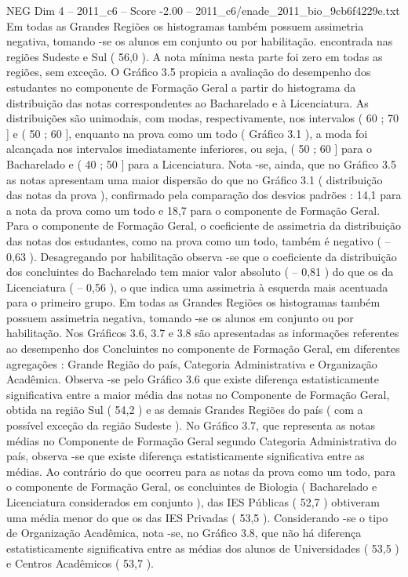 \begin{textsample}{NEG Dim 4 – 2011\_c6 – Score -2.00 – 2011\_c6/enade\_2011\_bio\_9cb6f4229e.txt}
Em todas as Grandes Regiões os histogramas também possuem assimetria negativa, tomando -se os alunos em conjunto ou por habilitação. encontrada nas regiões Sudeste e Sul ( 56,0 ).
A nota mínima nesta parte foi zero em todas as regiões, sem exceção.
O Gráfico 3.5 propicia a avaliação do desempenho dos estudantes no componente de Formação Geral a partir do histograma da distribuição das notas correspondentes ao Bacharelado e à Licenciatura.
As distribuições são unimodais, com modas, respectivamente, nos intervalos ( 60 ; 70 ] e ( 50 ; 60 ], enquanto na prova como um todo ( Gráfico 3.1 ), a moda foi alcançada nos intervalos imediatamente inferiores, ou seja, ( 50 ; 60 ] para o Bacharelado e ( 40 ; 50 ] para a Licenciatura.
Nota -se, ainda, que no Gráfico 3.5 as notas apresentam uma maior dispersão do que no Gráfico 3.1 ( distribuição das notas da prova ), confirmado pela comparação dos desvios padrões : 14,1 para a nota da prova como um todo e 18,7 para o componente de Formação Geral.
Para o componente de Formação Geral, o coeficiente de assimetria da distribuição das notas dos estudantes, como na prova como um todo, também é negativo ( – 0,63 ).
Desagregando por habilitação observa -se que o coeficiente da distribuição dos concluintes do Bacharelado tem maior valor absoluto ( – 0,81 ) do que os da Licenciatura ( – 0,56 ), o que indica uma assimetria à esquerda mais acentuada para o primeiro grupo.
Em todas as Grandes Regiões os histogramas também possuem assimetria negativa, tomando -se os alunos em conjunto ou por habilitação.
Nos Gráficos 3.6, 3.7 e 3.8 são apresentadas as informações referentes ao desempenho dos Concluintes no componente de Formação Geral, em diferentes agregações : Grande Região do país, Categoria Administrativa e Organização Acadêmica.
Observa -se pelo Gráfico 3.6 que existe diferença estatisticamente significativa entre a maior média das notas no Componente de Formação Geral, obtida na região Sul ( 54,2 ) e as demais Grandes Regiões do país ( com a possível exceção da região Sudeste ).
No Gráfico 3.7, que representa as notas médias no Componente de Formação Geral segundo Categoria Administrativa do país, observa -se que existe diferença estatisticamente significativa entre as médias.
Ao contrário do que ocorreu para as notas da prova como um todo, para o componente de Formação Geral, os concluintes de Biologia ( Bacharelado e Licenciatura considerados em conjunto ), das IES Públicas ( 52,7 ) obtiveram uma média menor do que os das IES Privadas ( 53,5 ).
Considerando -se o tipo de Organização Acadêmica, nota -se, no Gráfico 3.8, que não há diferença estatisticamente significativa entre as médias dos alunos de Universidades ( 53,5 ) e Centros Acadêmicos ( 53,7 ).

\end{textsample}
